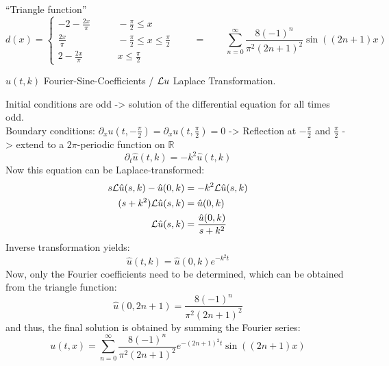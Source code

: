 ``Triangle function''
\[
d(x)
=
\begin{cases}
\displaystyle-2-\frac{2x}{\pi}&\qquad \displaystyle-\frac{\pi}2\le x\\
\displaystyle\frac{2x}{\pi}&\qquad \displaystyle-\frac{\pi}2\le x\le \frac{\pi}2\\
\displaystyle2-\frac{2x}{\pi}&\qquad \displaystyle x\le\frac{\pi}2
\end{cases}
 \qquad = \qquad \sum_{n=0}^\infty \frac{8(-1)^n}{\pi^2(2n+1)^2}\sin ((2n+1)x)
\]

 $\hat u(t,k)$ Fourier-Sine-Coefficients / ${\cal L} u$ Laplace Transformation.

Initial conditions are odd -> solution of the
differential equation for all times odd. \\
Boundary conditions:
$\partial_xu(t,-\frac{\pi}2)=\partial_xu(t,\frac{\pi}2)=0$
-> Reflection at
$-\frac{\pi}2$ and $\frac{\pi}2$ -> extend to a $2\pi$-periodic
function on $\mathbb R$
\[
\partial_t\hat u(t,k)=-k^2\hat u(t,k)
\]
Now this equation can be Laplace-transformed:
\begin{align*}
s{\cal L}\hat u(s,k) - \hat u(0,k)&=-k^2 {\cal L}\hat u(s,k)\\
(s+k^2){\cal L}\hat u(s,k)&=\hat u(0,k)\\
{\cal L}\hat u(s,k)&=\frac{\hat u(0,k)}{s+k^2}
\end{align*}
Inverse transformation yields:
\[
\hat u(t,k)=\hat u(0,k) e^{-k^2t}
\]
Now, only the Fourier coefficients need to be determined, which can be obtained from the triangle function:
\[
\hat u(0,2n+1)=
\frac{8(-1)^n}{\pi^2(2n+1)^2}
\]
and thus, the final solution is obtained by summing the Fourier series:
\[
u(t,x)=
\sum_{n=0}^\infty \frac{8(-1)^n}{\pi^2(2n+1)^2}e^{-(2n+1)^2t}\sin((2n+1)x)
\]

